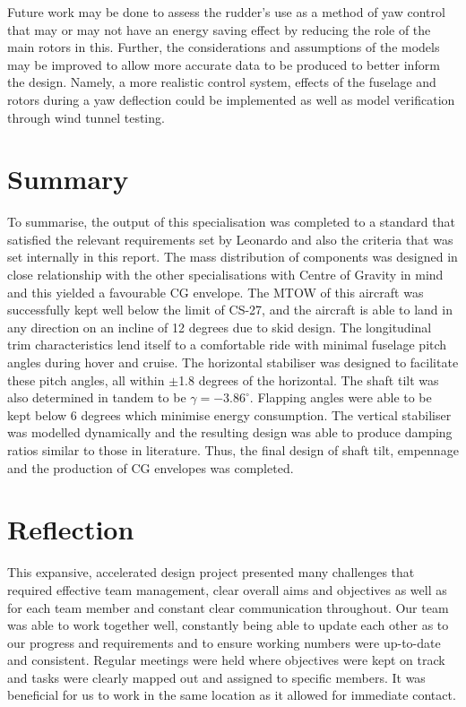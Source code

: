 \documentclass[11pt,a4paper]{article}
\begin{document}
Future work may be done to assess the rudder's use as a method of yaw control that may or may not have an energy saving effect by  reducing the role of the main rotors in this. Further, the considerations and assumptions of the models may be improved to allow more accurate data to be produced to better inform the design. Namely, a more realistic control system, effects of the fuselage and rotors during a yaw deflection could be implemented as well as model verification through wind tunnel testing.
%
%

\section{Summary}
To summarise, the output of this specialisation was completed to a standard that satisfied the relevant requirements set by Leonardo and also the criteria that was set internally in this report. 
The mass distribution of components was designed in close relationship with the other specialisations with Centre of Gravity in mind and this yielded a favourable CG envelope. The MTOW of this aircraft was successfully kept well below the limit of CS-27, and the aircraft is able to land in any direction on an incline of 12 degrees due to skid design. The longitudinal trim characteristics lend itself to a comfortable ride with minimal fuselage pitch angles during hover and cruise. The horizontal stabiliser was designed to facilitate these pitch angles, all within $\pm$1.8 degrees of the horizontal. The shaft tilt was also determined in tandem to be $\gamma=-3.86^\circ$. Flapping angles were able to be kept below 6 degrees which minimise energy consumption. 
The vertical stabiliser was modelled dynamically and the resulting design was able to produce damping ratios similar to those in literature.
Thus, the final design of shaft tilt, empennage and the production of CG envelopes was completed.




\section{Reflection}
This expansive, accelerated design project presented many challenges that required effective team management, clear overall aims and objectives as well as for each team member and constant clear communication throughout. 
Our team was able to work together well, constantly being able to update each other as to our progress and requirements and to ensure working numbers were up-to-date and consistent. Regular meetings were held where objectives were kept on track and tasks were clearly mapped out and assigned to specific members. It was beneficial for us to work in the same location as it allowed for immediate contact. 
\end{document}
